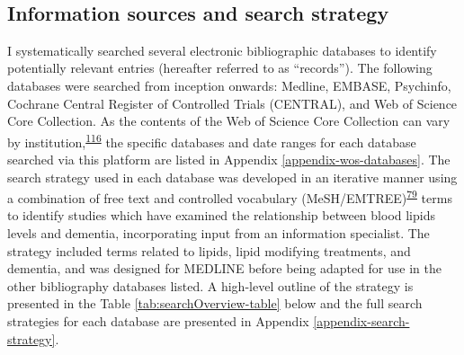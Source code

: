 \documentclass[a4paper, twoside]{templates/ociamthesis}
\begin{document}
~

\hypertarget{information-sources-and-search-strategy}{%
\subsection{Information sources and search strategy}\label{information-sources-and-search-strategy}}

I systematically searched several electronic bibliographic databases to identify potentially relevant entries (hereafter referred to as ``records''). The following databases were searched from inception onwards: Medline, EMBASE, Psychinfo, Cochrane Central Register of Controlled Trials (CENTRAL), and Web of Science Core Collection. As the contents of the Web of Science Core Collection can vary by institution,\textsuperscript{\protect\hyperlink{ref-gusenbauer2020}{116}} the specific databases and date ranges for each database searched via this platform are listed in Appendix \ref{appendix-wos-databases}. The search strategy used in each database was developed in an iterative manner using a combination of free text and controlled vocabulary (MeSH/EMTREE)\textsuperscript{\protect\hyperlink{ref-lefebvre2019searching}{79}} terms to identify studies which have examined the relationship between blood lipids levels and dementia, incorporating input from an information specialist. The strategy included terms related to lipids, lipid modifying treatments, and dementia, and was designed for MEDLINE before being adapted for use in the other bibliography databases listed. A high-level outline of the strategy is presented in the Table \ref{tab:searchOverview-table} below and the full search strategies for each database are presented in Appendix \ref{appendix-search-strategy}.

~
\end{document}

